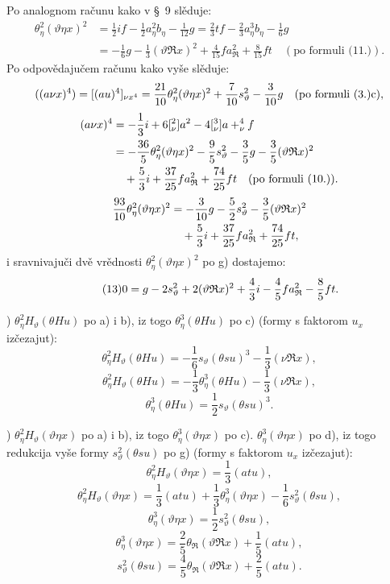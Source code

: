 \documentclass[11pt]{article}
\let\A\relax
\newcommand{\A}{\mathfrak A}
\newcommand{\R}{\mathfrak R}
\begin{document}
Po analognom računu kako v \S\ 9 slěduje:
\[
\begin{aligned}
\theta_\eta^2(\vartheta\eta x)^2
&=\frac12 i f-\frac12a_\eta^2b_\eta-\frac1{12}g
=\frac23tf-\frac23a_\eta^3b_\eta-\frac16g\\
&=-\frac16g-\frac13(\vartheta\R x)^2+\frac4{15}fa_\R^2+\frac8{15}ft
\quad(\text{po formuli (11.)}).
\end{aligned}
\]
Po odpovědajučem računu kako vyše slěduje:
\begingroup\small
\[
((a\A\nu x)^4)=[(a\A u)^4]_{\nu x^4}
=\frac{21}{10}\theta_\eta^2(\vartheta\eta x)^2+\frac7{10}s_\vartheta^2-\frac3{10}g
\quad(\text{po formuli (3.)}\mathrm{c}),
\]
\[
\begin{aligned}
(a\A\nu x)^4&=-\frac13i\A+6[\A_\nu^2]a^2-4[\A_\nu^3]a+\A_\nu^4f\\
&= -\frac{36}{5}\theta_\eta^2(\vartheta\eta x)^2-\frac95s_\vartheta^2-\frac35g-\frac35(\vartheta\R x)^2\\
&\quad+\frac53i\A+\frac{37}{25}fa_\R^2+\frac{74}{25}ft\quad(\text{po formuli (10.)}).
\end{aligned}
\]
\[
\begin{aligned}
\frac{93}{10}\theta_\eta^2(\vartheta\eta x)^2
&=-\frac3{10}g-\frac52s_\vartheta^2-\frac35(\vartheta\R x)^2\\
&\quad+\frac53i\A+\frac{37}{25}fa_\R^2+\frac{74}{25}ft,
\end{aligned}
\]
\endgroup
i sravnivajuči dvě vrědnosti $\theta_\eta^2(\vartheta\eta x)^2$ po \mbox{g)} dostajemo:
\[
\tag{13}
0=g-2s_\vartheta^2+2(\vartheta\R x)^2+\frac43i\A-\frac45fa_\R^2-\frac85ft.
\]

) $\theta_\eta^2H_\vartheta(\theta Hu)$ po \mbox{a)} i \mbox{b)}, iz togo $\theta_\eta^3(\theta Hu)$ po \mbox{c)} (formy s faktorom $u_x$ izčezajut):
\[
\theta_\eta^2H_\vartheta(\theta Hu)=-\frac16s_\vartheta(\theta su)^3-\frac13(\nu\R x),
\]
\[
\theta_\eta^2H_\vartheta(\theta Hu)=-\frac13\theta_\eta^3(\theta Hu)-\frac13(\nu\R x),
\]
\[
\theta_\eta^3(\theta Hu)=\frac12s_\vartheta(\theta su)^3.
\]

) $\theta_\eta^2H_\vartheta(\vartheta\eta x)$ po \mbox{a)} i \mbox{b)}, iz togo $\theta_\eta^3(\vartheta\eta x)$ po \mbox{c)}. $\theta_\eta^3(\vartheta\eta x)$ po \mbox{d)}, iz togo redukcija vyše formy $s_\vartheta^2(\theta su)$ po \mbox{g)} (formy s faktorom $u_x$ izčezajut):
\[
\theta_\eta^2H_\vartheta(\vartheta\eta x)=\frac13(atu),
\]
\[
\theta_\eta^2H_\vartheta(\vartheta\eta x)=\frac13(atu)+\frac13\theta_\eta^3(\vartheta\eta x)-\frac16s_\vartheta^2(\theta su),
\]
\[
\theta_\eta^3(\vartheta\eta x)=\frac12s_\vartheta^2(\theta su),
\]
\[
\theta_\eta^3(\vartheta\eta x)=\frac25\theta_\R(\vartheta\R x)+\frac15(atu),
\]
\[
\tag{14}
s_\vartheta^2(\theta su)=\frac45\theta_\R(\vartheta\R x)+\frac25(atu).
\]
\end{document}
